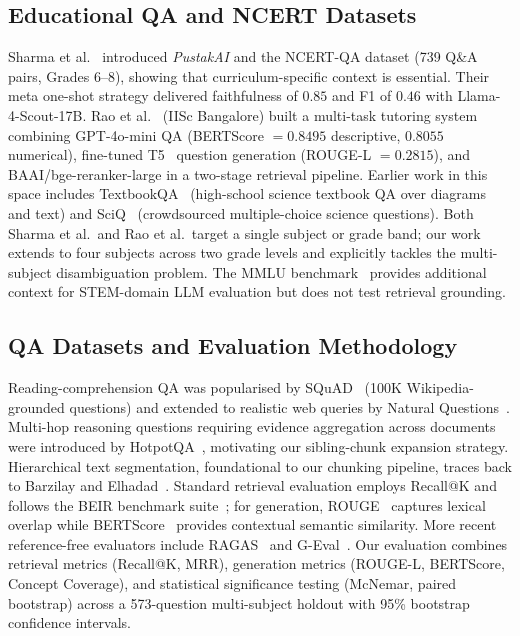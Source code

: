 \documentclass[conference]{IEEEtran}
\begin{document}
\subsection{Educational QA and NCERT Datasets}
Sharma et al.~\cite{sharma2025pustakai} introduced \emph{PustakAI} and the NCERT-QA dataset (739 Q\&A pairs, Grades 6--8), showing that curriculum-specific context is essential. Their meta one-shot strategy delivered faithfulness of $0.85$ and F1 of $0.46$ with Llama-4-Scout-17B. Rao et al.~\cite{rao2026team05} (IISc Bangalore) built a multi-task tutoring system combining GPT-4o-mini QA (BERTScore $=0.8495$ descriptive, $0.8055$ numerical), fine-tuned T5~\cite{raffel2020t5} question generation (ROUGE-L $=0.2815$), and BAAI/bge-reranker-large in a two-stage retrieval pipeline. Earlier work in this space includes TextbookQA~\cite{kembhavi2018textbookqa} (high-school science textbook QA over diagrams and text) and SciQ~\cite{welbl2017sciq} (crowdsourced multiple-choice science questions). Both Sharma et al.\ and Rao et al.\ target a single subject or grade band; our work extends to four subjects across two grade levels and explicitly tackles the multi-subject disambiguation problem. The MMLU benchmark~\cite{hendrycks2021mmlu} provides additional context for STEM-domain LLM evaluation but does not test retrieval grounding.

\subsection{QA Datasets and Evaluation Methodology}
Reading-comprehension QA was popularised by SQuAD~\cite{rajpurkar2016squad} (100K Wikipedia-grounded questions) and extended to realistic web queries by Natural Questions~\cite{kwiatkowski2019nq}. Multi-hop reasoning questions requiring evidence aggregation across documents were introduced by HotpotQA~\cite{yang2018hotpotqa}, motivating our sibling-chunk expansion strategy. Hierarchical text segmentation, foundational to our chunking pipeline, traces back to Barzilay and Elhadad~\cite{barzilay1997segmentation}. Standard retrieval evaluation employs Recall@K and follows the BEIR benchmark suite~\cite{thakur2021beir}; for generation, ROUGE~\cite{lin2004rouge} captures lexical overlap while BERTScore~\cite{zhang2019bertscore} provides contextual semantic similarity. More recent reference-free evaluators include RAGAS~\cite{es2024ragas} and G-Eval~\cite{liu2023geval}. Our evaluation combines retrieval metrics (Recall@K, MRR), generation metrics (ROUGE-L, BERTScore, Concept Coverage), and statistical significance testing (McNemar, paired bootstrap) across a 573-question multi-subject holdout with 95\% bootstrap confidence intervals.
\end{document}
